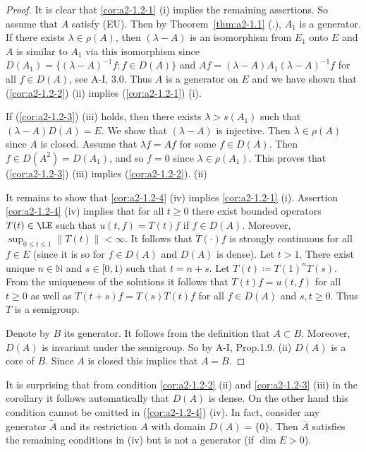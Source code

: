 \begin{proof}
It is clear that \ref{cor:a2-1.2-1} (\lnm i) implies the remaining assertions.
So assume that $A$ satisfy (EU).
Then by Theorem~\ref{thm:a2-1.1} (.), $A_{1}$ is a generator.
If there exists $\lambda \in \rho(A)$, then $(\lambda-A)$ is an isomorphism from $E_{1}$ onto $E$ and $A$ is similar to $A_{1}$ via this isomorphism 
since $D(A_{1}) = \{(\lambda-A)^{-1}f \colon f \in D(A)\}$ and $Af = (\lambda-A)A_{1}(\lambda-A)^{-1}f$ for all $f \in D(A)$, 
see A-I, 3.0.
Thus $A$ is a generator on $E$ and we have shown that (\ref{cor:a2-1.2-2}) (\lnm ii) implies (\ref{cor:a2-1.2-1}) (\lnm i).

If (\ref{cor:a2-1.2-3}) (\lnm iii) holds, then there exists $\lambda > s(A_{1})$ such that $(\lambda-A)D(A) = E$.
We show that $(\lambda-A)$ is injective.
Then $\lambda \in \rho(A)$ since $A$ is closed.
Assume that $\lambda f = Af$ for some $f \in D(A)$.
Then $f \in D(A^{2}) = D(A_{1})$, and so $f = 0$ since $\lambda \in \rho(A_{1})$.
This proves that (\ref{cor:a2-1.2-3}) (\lnm iii) implies (\ref{cor:a2-1.2-2}). (\lnm ii)

It remains to show that \ref{cor:a2-1.2-4} (\lnm iv) implies \ref{cor:a2-1.2-1} (\lnm i).
Assertion \ref{cor:a2-1.2-4} (\lnm iv) implies that for all $ t \geq 0 $ there exist bounded operators $ T(t) \in \LE $ such that $ u(t,f) = T(t)f $ if $ f \in D(A) $.
Moreover, $ \sup_{0 \leq t \leq 1} \|T(t)\| < \infty $.
It follows that $ T(\cdot)f $ is strongly continuous for all $ f \in E $ (since it is so for $ f \in D(A) $ and $ D(A) $ is dense).
Let $ t > 1 $.
There exist unique $ n \in \mathbb{N} $ and $ s \in [0,1) $ such that $ t = n + s $.
Let $ T(t) \coloneqq T(1)^{n}T(s) $.
From the uniqueness of the solutions it follows that $ T(t)f = u(t,f) $ for all $ t \geq 0 $ as well as $ T(t+s)f = T(s)T(t)f $ for all $ f \in D(A) $ and $ s,t \geq 0 $.
Thus $ T $ is a semigroup.

Denote by $ B $ its generator.
It follows from the definition that $ A \subset B $.
Moreover, $ D(A) $ is invariant under the semigroup.
So by A-I, Prop.1.9. (ii) $ D(A) $ is a core of $ B $.
Since $ A $ is closed this implies that $ A = B $.
\end{proof}
\begin{remark}\label{rem:a2-1.3}
It is surprising that from condition \ref{cor:a2-1.2-2} (\lnm ii) and \ref{cor:a2-1.2-3} (\lnm iii) in the corollary it follows automatically that $ D(A) $ is dense.
On the other hand this condition cannot be omitted in (\ref{cor:a2-1.2-4}) (\lnm iv).
In fact, consider any generator $ \tilde{A} $ and its restriction $ A $ with domain $ D(A) = \{0\} $.
Then $ \overline{A} $ satisfies the remaining conditions in (iv) but is not a generator (if $ \dim E > 0 $).
\end{remark}
